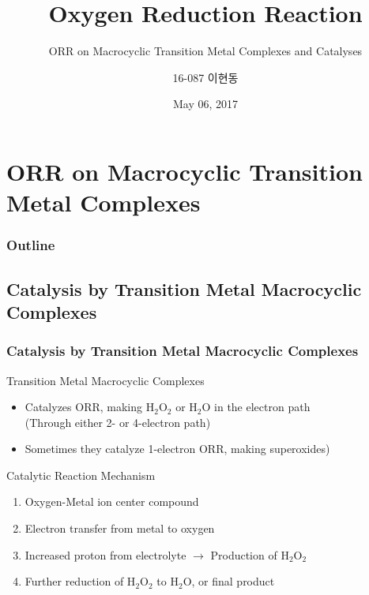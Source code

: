 \documentclass{beamer}
\title{Oxygen Reduction Reaction}
\subtitle{ORR on Macrocyclic Transition Metal Complexes and Catalyses}
\author[16-087 이현동]
{16-087 이현동\inst{1}}
\institute
{
  \inst{1}%
  Korea Science Academy of KAIST
}
\date{May 06, 2017}
\begin{document}
\begin{frame}
\titlepage
\end{frame}

\section{ORR on Macrocyclic Transition Metal Complexes}

\begin{frame}
\frametitle{Outline}
\tableofcontents[currentsection]
\end{frame}


\subsection{Catalysis by Transition Metal Macrocyclic Complexes}

\begin{frame}
\frametitle{Catalysis by Transition Metal Macrocyclic Complexes}

\begin{block}{Transition Metal Macrocyclic Complexes}
\begin{itemize}
\item{Catalyzes ORR, making H$_2$O$_2$ or H$_2$O in the electron path\\ (Through either 2- or 4-electron path)}
\item{Sometimes they catalyze 1-electron ORR, making superoxides)}
\end{itemize}
\end{block}

\begin{block}{Catalytic Reaction Mechanism}
\begin{enumerate}
    \item{Oxygen-Metal ion center compound}
    \item{Electron transfer from metal to oxygen}
    \item{Increased proton from electrolyte $\longrightarrow$ Production of H$_2$O$_2$}
    \item{Further reduction of H$_2$O$_2$ to H$_2$O, or final product}
\end{enumerate}
\end{block}
\end{frame}
\end{document}
